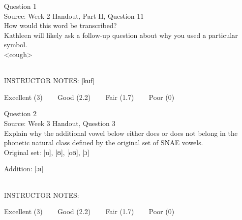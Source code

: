 \documentclass[12pt]{article}
\begin{document}
\begin{center}
\textbf{{\color{violet}{\HUGE 20201001 Thursday\\}}}

\textbf{{\color{violet}{\HUGE ALL EXAMS (with notes)\\}}}

\end{center}
\newpage

\begin{center}
\textbf{{\color{blue}{\HUGE START OF EXAM\\}}}

\textbf{{\color{blue}{\HUGE Student ID: 80652\\}}}

\textbf{{\color{blue}{\HUGE 4:00\\}}}

\end{center}
\newpage

{\large Question 1}\\

Source: Week 2 Handout, Part II, Question 11\\

How would this word be transcribed?\\ Kathleen will likely ask a follow-up question about why you used a particular symbol.\\

<cough>


~\\
INSTRUCTOR NOTES: [kɑf]


\vfill
Excellent (3) ~~~ Good (2.2) ~~~ Fair (1.7) ~~~ Poor (0)
\newpage

{\large Question 2}\\

Source: Week 3 Handout, Question 3\\

Explain why the additional vowel below either does or does not belong in the phonetic natural class defined by the original set of SNAE vowels.\\

Original set: {[u]}, {[ʊ]}, {[oʊ]}, {[ɔ]}

Addition: {[ɔɪ]}


~\\
INSTRUCTOR NOTES: 


\vfill
Excellent (3) ~~~ Good (2.2) ~~~ Fair (1.7) ~~~ Poor (0)
\newpage

\begin{center}
\textbf{{\color{red}{\HUGE END OF EXAM}}}\\

\end{center}
\newpage
\end{document}

